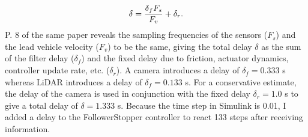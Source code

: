 \documentclass[12pt, letterpaper]{article}
\begin{document}
\begin{itemize}
\begin{eqnarray}
\delta={\delta_f F_s\over F_v}+\delta_r.
\end{eqnarray}
P. 8 of the same paper reveals the sampling frequencies of the sensors ($F_s$) and the lead vehicle velocity ($F_v$) to be the same, giving the total delay $\delta$ as the sum of the filter delay ($\delta_f$) and the fixed delay due to friction, actuator dynamics, controller update rate, etc. ($\delta_r$). A camera introduces a delay of $\delta_f=0.333$ s whereas LiDAR introduces a delay of $\delta_f=0.133$ s. For a conservative estimate, the delay of the camera is used in conjunction with the fixed delay $\delta_r=1.0$ s to give a total delay of $\delta=1.333$ s. Because the time step in Simulink is 0.01, I added a delay to the FollowerStopper controller to react 133 steps after receiving information.
\end{itemize}

\end{document}
